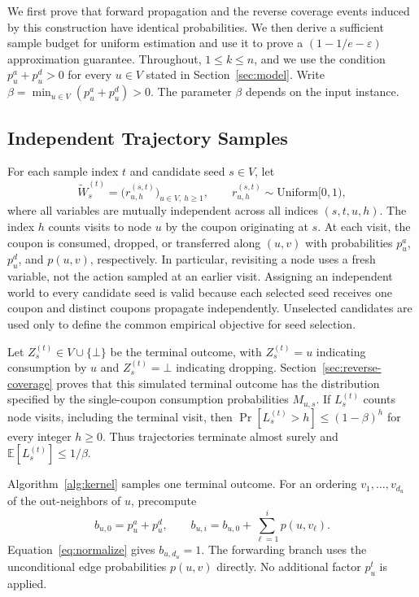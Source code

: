 \documentclass[sigconf]{acmart}
\begin{document}
We first prove that forward propagation and the reverse coverage
events induced by this construction have identical probabilities.
We then derive a sufficient sample budget for uniform estimation
and use it to prove a $(1-1/e-\varepsilon)$ approximation guarantee.
Throughout, $1\le k\le n$, and we use the condition
$p_u^a+p_u^d>0$ for every $u\in V$ stated in
Section~\ref{sec:model}. Write
$\beta=\min_{u\in V}(p_u^a+p_u^d)>0$.
The parameter $\beta$ depends on the input instance.

\subsection{Independent Trajectory Samples}
\label{sec:source-worlds}

For each sample index $t$ and candidate seed $s\in V$, let
\[
  \widetilde W_s^{(t)}
  =\bigl(r_{u,h}^{(s,t)}\bigr)_{u\in V,\ h\ge1},
  \qquad r_{u,h}^{(s,t)}\sim\mathrm{Uniform}[0,1),
\]
where all variables are mutually independent across all indices
$(s,t,u,h)$. The index $h$ counts visits to node $u$ by the coupon
originating at $s$. At each visit, the coupon is consumed, dropped,
or transferred along $(u,v)$ with probabilities $p_u^a$, $p_u^d$,
and $p(u,v)$, respectively. In particular, revisiting a node uses
a fresh variable, not the action sampled at an earlier visit.
Assigning an independent world to every candidate seed is valid
because each selected seed receives one coupon and distinct coupons
propagate independently. Unselected candidates are used only to
define the common empirical objective for seed selection.

Let $Z_s^{(t)}\in V\cup\{\bot\}$ be the terminal outcome, with
$Z_s^{(t)}=u$ indicating consumption by $u$ and $Z_s^{(t)}=\bot$
indicating dropping. Section~\ref{sec:reverse-coverage} proves that
this simulated terminal outcome has the distribution specified by
the single-coupon consumption probabilities $M_{u,s}$.
If $L_s^{(t)}$ counts node visits, including the terminal visit,
then $\Pr[L_s^{(t)}>h]\le(1-\beta)^h$ for every integer $h\ge0$.
Thus trajectories terminate almost surely and
$\mathbb E[L_s^{(t)}]\le1/\beta$.

Algorithm~\ref{alg:kernel} samples one terminal outcome. For an ordering
$v_1,\ldots,v_{d_u}$ of the out-neighbors of $u$, precompute
\[
 b_{u,0}=p_u^a+p_u^d,\qquad
 b_{u,i}=b_{u,0}+\sum_{\ell=1}^{i}p(u,v_\ell).
\]
Equation~\eqref{eq:normalize} gives $b_{u,d_u}=1$.
The forwarding branch uses the unconditional edge probabilities
$p(u,v)$ directly. No additional factor $p_u^t$ is applied.
\end{document}
